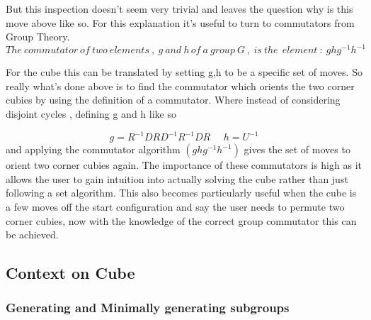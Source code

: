 \documentclass{article}
\begin{document}
But this inspection doesn't seem very trivial and leaves the question why is this move above like so. For this explanation it's useful to turn to commutators from Group Theory. 
\begin{equation}
The\ commutator\ of\ two\ elements\ ,\ g\ and\ h\, of\ a\ group\ G\ ,\ is\ the\ \ element\ :\ ghg^{-1}h^{-1}
\end{equation}

For the cube this can be translated by setting g,h to be a specific set of moves. So really what's done above is to find the commutator which orients the two corner cubies by using the definition of a commutator. Where instead of considering disjoint cycles , defining g and h like so

\begin{equation}
	g = R^{-1}DRD^{-1}R^{-1}DR\ \ \ \ \ \ 
    h = U^{-1}
\end{equation}
and applying the commutator algorithm $(ghg^{-1}h^{-1})$ gives the set of moves to orient two corner cubies again. The importance of these commutators is high as it allows the user to gain intuition into actually solving the cube rather than just following a set algorithm. This also becomes particularly useful when the cube is a few moves off the start configuration and say the user needs to permute two corner cubies, now with the knowledge of the correct group commutator this can be achieved.



\subsection*{Context on Cube}
\subsubsection*{Generating and Minimally generating subgroups}
\end{document}
